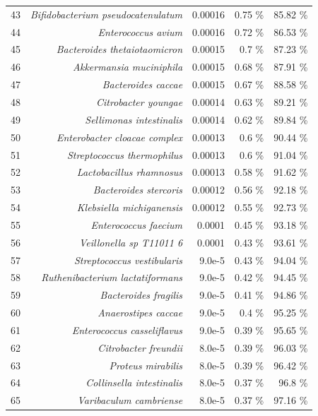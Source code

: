\documentclass{article}
\begin{document}
\begin{table}[h]
\begin{centering}
\begin{tabular}{|r|r|r|r|r|}
      43 & \textit{Bifidobacterium pseudocatenulatum} & 0.00016 & 0.75 \% & 85.82 \% \\
      44 & \textit{Enterococcus avium} & 0.00016 & 0.72 \% & 86.53 \% \\
      45 & \textit{Bacteroides thetaiotaomicron} & 0.00015 & 0.7 \% & 87.23 \% \\
      46 & \textit{Akkermansia muciniphila} & 0.00015 & 0.68 \% & 87.91 \% \\
      47 & \textit{Bacteroides caccae} & 0.00015 & 0.67 \% & 88.58 \% \\
      48 & \textit{Citrobacter youngae} & 0.00014 & 0.63 \% & 89.21 \% \\
      49 & \textit{Sellimonas intestinalis} & 0.00014 & 0.62 \% & 89.84 \% \\
      50 & \textit{Enterobacter cloacae complex} & 0.00013 & 0.6 \% & 90.44 \% \\
      51 & \textit{Streptococcus thermophilus} & 0.00013 & 0.6 \% & 91.04 \% \\
      52 & \textit{Lactobacillus rhamnosus} & 0.00013 & 0.58 \% & 91.62 \% \\
      53 & \textit{Bacteroides stercoris} & 0.00012 & 0.56 \% & 92.18 \% \\
      54 & \textit{Klebsiella michiganensis} & 0.00012 & 0.55 \% & 92.73 \% \\
      55 & \textit{Enterococcus faecium} & 0.0001 & 0.45 \% & 93.18 \% \\
      56 & \textit{Veillonella sp T11011 6} & 0.0001 & 0.43 \% & 93.61 \% \\
      57 & \textit{Streptococcus vestibularis} & 9.0e-5 & 0.43 \% & 94.04 \% \\
      58 & \textit{Ruthenibacterium lactatiformans} & 9.0e-5 & 0.42 \% & 94.45 \% \\
      59 & \textit{Bacteroides fragilis} & 9.0e-5 & 0.41 \% & 94.86 \% \\
      60 & \textit{Anaerostipes caccae} & 9.0e-5 & 0.4 \% & 95.25 \% \\
      61 & \textit{Enterococcus casseliflavus} & 9.0e-5 & 0.39 \% & 95.65 \% \\
      62 & \textit{Citrobacter freundii} & 8.0e-5 & 0.39 \% & 96.03 \% \\
      63 & \textit{Proteus mirabilis} & 8.0e-5 & 0.39 \% & 96.42 \% \\
      64 & \textit{Collinsella intestinalis} & 8.0e-5 & 0.37 \% & 96.8 \% \\
      65 & \textit{Varibaculum cambriense} & 8.0e-5 & 0.37 \% & 97.16 \% \\

\end{tabular}
\end{centering}
\end{table}
\end{document}
